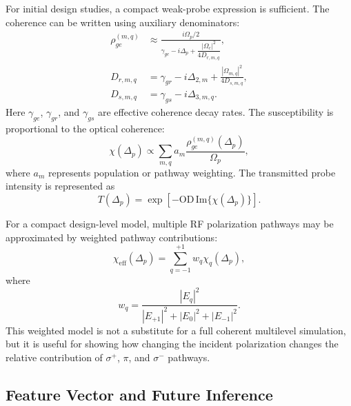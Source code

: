 \documentclass{ieeeaccess}
\begin{document}
For initial design studies, a compact weak-probe expression is sufficient. The coherence can be written using auxiliary denominators:
\begin{subequations}
\label{eq:annex_weak_probe_model}
\begin{align}
\rho_{ge}^{(m,q)}
&\approx
\frac{i\Omega_p/2}
{\gamma_{ge}-i\Delta_p+\dfrac{|\Omega_c|^2}{4D_{r,m,q}}},
\label{eq:annex_rho_ge_compact}\\
D_{r,m,q}
&=
\gamma_{gr}
-
i\Delta_{2,m}
+
\frac{|\Omega_{m,q}|^2}{4D_{s,m,q}},
\label{eq:annex_Dr}\\
D_{s,m,q}
&=
\gamma_{gs}
-
i\Delta_{3,m,q}.
\label{eq:annex_Ds}
\end{align}
\end{subequations}
Here \(\gamma_{ge}\), \(\gamma_{gr}\), and \(\gamma_{gs}\) are effective coherence decay rates. The susceptibility is proportional to the optical coherence:
\begin{equation}
\chi(\Delta_p)
\propto
\sum_{m,q}
a_m
\frac{\rho_{ge}^{(m,q)}(\Delta_p)}{\Omega_p},
\label{eq:annex_susceptibility_sum}
\end{equation}
where \(a_m\) represents population or pathway weighting. The transmitted probe intensity is represented as
\begin{equation}
T(\Delta_p)
=
\exp
\left[
-\mathrm{OD}\,
\mathrm{Im}
\{
\chi(\Delta_p)
\}
\right].
\label{eq:annex_transmission_model}
\end{equation}

For a compact design-level model, multiple RF polarization pathways may be approximated by weighted pathway contributions:
\begin{equation}
\chi_{\mathrm{eff}}(\Delta_p)
=
\sum_{q=-1}^{+1}
w_q
\chi_q(\Delta_p),
\label{eq:annex_weighted_chi}
\end{equation}
where
\begin{equation}
w_q
=
\frac{|E_q|^2}
{|E_{+1}|^2+|E_0|^2+|E_{-1}|^2}.
\label{eq:annex_pathway_weights}
\end{equation}
This weighted model is not a substitute for a full coherent multilevel simulation, but it is useful for showing how changing the incident polarization changes the relative contribution of \(\sigma^+\), \(\pi\), and \(\sigma^-\) pathways.

\subsection{Feature Vector and Future Inference}
\label{annex:feature_vector}
\end{document}
